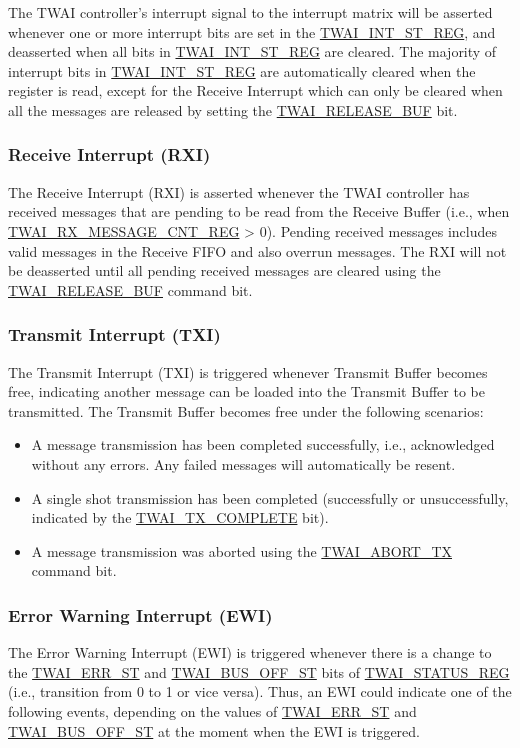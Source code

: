 \documentclass[main\_\_EN.tex]{subfiles}
\begin{document}
The TWAI controller's interrupt signal to the interrupt matrix will be asserted whenever one or more interrupt bits are set in the \hyperref[regdesc:TWAIINTSTREG]{TWAI\_INT\_ST\_REG}, and deasserted when all bits in \hyperref[regdesc:TWAIINTSTREG]{TWAI\_INT\_ST\_REG} are cleared. The majority of interrupt bits in \hyperref[regdesc:TWAIINTSTREG]{TWAI\_INT\_ST\_REG} are automatically cleared when the register is read, except for the Receive Interrupt which can only be cleared when all the messages are released by setting the \hyperref[fielddesc:TWAIRELEASEBUF]{TWAI\_RELEASE\_BUF} bit.

\subsubsection{Receive Interrupt (RXI)}
\label{other:twai-para-rxi}
The Receive Interrupt (RXI) is asserted whenever the TWAI controller has received messages that are pending to be read from the Receive Buffer (i.e., when \hyperref[regdesc:TWAIRXMESSAGECNTREG]{TWAI\_RX\_MESSAGE\_CNT\_REG} > 0). Pending received messages includes valid messages in the Receive FIFO and also overrun messages. The RXI will not be deasserted until all pending received messages are cleared using the \hyperref[fielddesc:TWAIRELEASEBUF]{TWAI\_RELEASE\_BUF} command bit.


\subsubsection{Transmit Interrupt (TXI)}
\label{other:twai-para-txi}
The Transmit Interrupt (TXI) is triggered whenever Transmit Buffer becomes free, indicating another message can be loaded into the Transmit Buffer to be transmitted. The Transmit Buffer becomes free under the following scenarios:

\begin{itemize}
    \item A message transmission has been completed successfully, i.e., acknowledged without any errors. Any failed messages will automatically be resent.
    \item A single shot transmission has been completed (successfully or unsuccessfully, indicated by the \hyperref[fielddesc:TWAITXCOMPLETE]{TWAI\_TX\_COMPLETE} bit).
    \item A message transmission was aborted using the \hyperref[fielddesc:TWAIABORTTX]{TWAI\_ABORT\_TX} command bit.
\end{itemize}

\subsubsection{Error Warning Interrupt (EWI)}
\label{other:twai-para-ewi}
The Error Warning Interrupt (EWI) is triggered whenever there is a change to the \hyperref[fielddesc:TWAIERRST]{TWAI\_ERR\_ST} and \hyperref[fielddesc:TWAIBUSOFFST]{TWAI\_BUS\_OFF\_ST} bits of \hyperref[regdesc:TWAISTATUSREG]{TWAI\_STATUS\_REG} (i.e., transition from 0 to 1 or vice versa). Thus, an EWI could indicate one of the following events, depending on the values of \hyperref[fielddesc:TWAIERRST]{TWAI\_ERR\_ST} and \hyperref[fielddesc:TWAIBUSOFFST]{TWAI\_BUS\_OFF\_ST} at the moment when the EWI is triggered.
\end{document}
